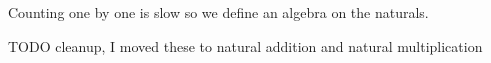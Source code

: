 

Counting one by one is slow so we define
an algebra on the naturals.

TODO cleanup, I moved these to natural addition and natural multiplication



